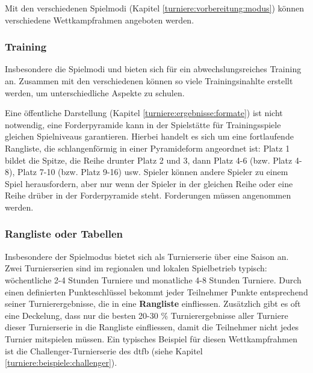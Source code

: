 Mit den verschiedenen Spielmodi (Kapitel \ref{turniere:vorbereitung:modus}) können verschiedene Wettkampfrahmen angeboten werden. 

\subsubsection{Training}
\label{turniere:ergebnisse:rahmen:training}

Insbesondere die Spielmodi  und  bieten sich für ein abwechslungsreiches Training an. Zusammen mit den verschiedenen  können so viele Trainingsinahlte erstellt werden, um unterschiedliche Aspekte zu schulen. 

Eine öffentliche Darstellung (Kapitel \ref{turniere:ergebnisse:formate}) ist nicht notwendig, eine Forderpyramide kann in der Spielstätte für Trainingsspiele gleichen Spielniveaus garantieren.
Hierbei handelt es sich um eine fortlaufende Rangliste, die schlangenförmig in einer Pyramideform angeordnet ist: Platz 1 bildet die Spitze, die Reihe drunter Platz 2 und 3, dann Platz 4-6 (bzw. Platz 4-8), Platz 7-10 (bzw. Platz 9-16) usw. 
Spieler können andere Spieler zu einem Spiel herausfordern, aber nur wenn der Spieler in der gleichen Reihe oder eine Reihe drüber in der Forderpyramide steht. Forderungen müssen angenommen werden.


\subsubsection{Rangliste oder Tabellen}
\label{turniere:ergebnisse:rahmen:rangliste}

Insbesondere der Spielmodus  bietet sich als Turnierserie über eine Saison an.
Zwei Turnierserien sind im regionalen und lokalen Spielbetrieb typisch: wöchentliche 2-4 Stunden Turniere und monatliche 4-8 Stunden Turniere. 
Durch einen definierten Punkteschlüssel bekommt jeder Teilnehmer Punkte entsprechend seiner Turnierergebnisse, die in eine \textbf{Rangliste} einfliessen. 
Zusätzlich gibt es oft eine Deckelung, dass nur die besten 20-30 \% Turnierergebnisse aller Turniere dieser Turnierserie in die Rangliste einfliessen, damit die Teilnehmer nicht jedes Turnier mitspielen müssen. 
Ein typisches Beispiel für diesen Wettkampfrahmen ist die Challenger-Turnierserie des \gls{dtfb} (siehe Kapitel \ref{turniere:beispiele:challenger}).

